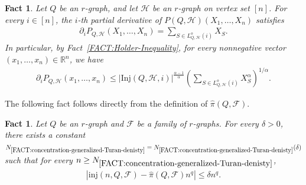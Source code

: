\documentclass[11pt,a4paper]{article}
\newtheorem{fact}[definition]{Fact}
\begin{document}
\begin{fact}\label{FACT:derivative-Lagrange-poly}
    Let $Q$ be an $r$-graph, and let $\mathcal{H}$ be an $r$-graph on vertex set $[n]$. 
    For every $i \in [n]$, the $i$-th partial derivative of $P(Q,\mathcal{H})(X_1, \ldots, X_n)$ satisfies
    \begin{align}\label{equ:derivative-link}
        \partial_{i} P_{Q,\mathcal{H}}(X_1, \ldots, X_n)
        = \sum_{S \in L_{Q, \mathcal{H}}^{o}(i)} X_{S}. 
    \end{align}
    In particular, by Fact~\ref{FACT:Holder-Inequality}, for every nonnegative vector $(x_1, \ldots, x_n) \in \mathbb{R}^{n}$, we have 
    \begin{align}\label{equ:derivative-link-holder}
        \partial_{i} P_{Q,\mathcal{H}}(x_1, \ldots, x_n)
        \le |\mathrm{Inj}(Q,\mathcal{H},i)|^{\frac{\alpha-1}{\alpha}} \left( \sum_{S \in L_{Q, \mathcal{H}}^{o}(i)} X_{S}^{\alpha} \right)^{1/\alpha}.
    \end{align}
\end{fact}


The following fact follows directly from the definition of $\hat{\pi}(Q,\mathcal{F})$. 
%
\begin{fact}\label{FACT:concentration-generalized-Turan-denisty}
    Let $Q$ be an $r$-graph and $\mathcal{F}$ be a family of $r$-graphs. 
    For every $\delta>0$, there exists a constant $N_{\ref{FACT:concentration-generalized-Turan-denisty}} = N_{\ref{FACT:concentration-generalized-Turan-denisty}}(\delta)$ such that for every $n \ge N_{\ref{FACT:concentration-generalized-Turan-denisty}}$, 
    \begin{align}\label{equ:concentration-generalized-Turan-denisty}
        \left| \mathrm{inj}(n,Q,\mathcal{F}) - \hat{\pi}(Q,\mathcal{F}) n^{q} \right|
        \le \delta n^{q}. 
    \end{align}
\end{fact}
\end{document}
